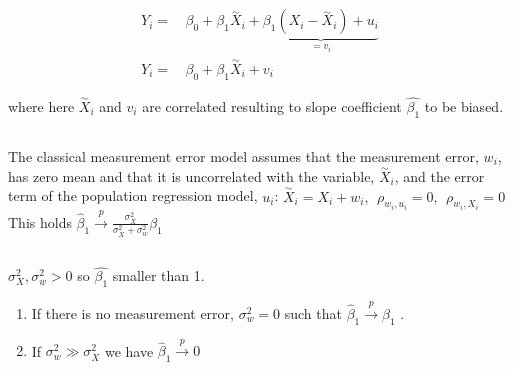 \documentclass[
  letterpaper,
  DIV=11,
  numbers=noendperiod]{scrartcl}
\begin{document}
\hypertarget{section-1}{%
\subsection{}\label{section-1}}

\[\begin{align*}
  Y_i =& \, \beta_0 + \beta_1 \overset{\sim}{X}_i + \underbrace{\beta_1 (X_i - \overset{\sim}{X}_i) + u_i}_{=v_i} \\
  Y_i =& \, \beta_0 + \beta_1 \overset{\sim}{X}_i + v_i
\end{align*}\]

where here \(\overset{\sim}{X}_i\) and \(v_i\) are correlated resulting
to slope coefficient \(\hat{\beta_1}\) to be biased.

\hypertarget{section-2}{%
\subsection{}\label{section-2}}

The classical measurement error model assumes that the measurement
error, \(w_i\), has zero mean and that it is uncorrelated with the
variable, \(\overset{\sim}{X}_i\), and the error term of the population
regression model, \(u_i\):
\(\begin{equation} \overset{\sim}{X}_i = X_i + w_i, \ \ \rho_{w_i,u_i}=0, \ \ \rho_{w_i,X_i}=0 \end{equation}\)
This holds
\(\begin{equation} \widehat{\beta}_1 \xrightarrow{p}{\frac{\sigma_{X}^2}{\sigma_{X}^2 + \sigma_{w}^2}} \beta_1 \tag{9.1} \end{equation}\)

\hypertarget{section-3}{%
\subsection{}\label{section-3}}

\(\sigma_{X}^2, \sigma_{w}^2 > 0\) so \(\hat{\beta_1}\) smaller than 1.

\begin{enumerate}
\def\labelenumi{\arabic{enumi}.}
\item
  If there is no measurement error, \(\sigma_{w}^2=0\) such that
  \(\widehat{\beta}_1 \xrightarrow{p}{\beta_1}\) .
\item
  If \(\sigma_{w}^2 \gg \sigma_{X}^2\) we have
  \(\widehat{\beta}_1 \xrightarrow{p}{0}\)
\end{enumerate}
\end{document}
